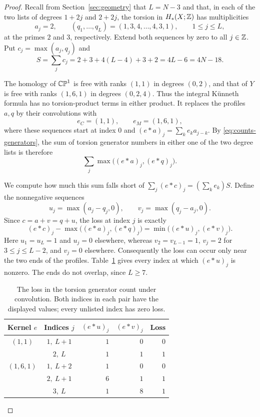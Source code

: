 \begin{proof}
Recall from Section~\ref{sec:geometry} that $L=N-3$ and that, in each of the two lists of degrees
$1+2j$ and $2+2j$, the torsion in $H_*(X;\mathbb Z)$ has multiplicities
\[
 a_j=2,\qquad
 (q_1,\ldots,q_L)=(1,3,4,\ldots,4,3,1),
 \qquad 1\leq j\leq L,
\]
at the primes $2$ and $3$, respectively.  Extend both sequences by
zero to all $j\in\mathbb Z$.  Put $c_j=\max(a_j,q_j)$ and
\begin{equation}\label{eq:counts-S}
 S=\sum_jc_j=2+3+4(L-4)+3+2=4L-6=4N-18.
\end{equation}

The homology of $\mathbb{CP}^1$ is free with ranks $(1,1)$ in degrees
$(0,2)$, and that of $Y$ is free with ranks $(1,6,1)$ in degrees
$(0,2,4)$.  Thus the integral K\"unneth formula has no torsion-product
terms in either product.  It replaces the profiles $a,q$ by their
convolutions with
\[
 e_C=(1,1),\qquad e_M=(1,6,1),
\]
where these sequences start at index $0$ and
$(e*a)_j=\sum_ke_ka_{j-k}$.  By
\eqref{eq:counts-generators}, the sum of torsion generator numbers
in either one of the two degree lists is therefore
\[
 \sum_j\max\bigl((e*a)_j,(e*q)_j\bigr).
\]

We compute how much this sum falls short of
$\sum_j(e*c)_j=(\sum_ke_k)S$.  Define the nonnegative sequences
\[
 u_j=\max(a_j-q_j,0),\qquad
 v_j=\max(q_j-a_j,0).
\]
Since $c=a+v=q+u$, the loss at index $j$ is exactly
\begin{equation}\label{eq:counts-loss}
 (e*c)_j-\max\bigl((e*a)_j,(e*q)_j\bigr)
 =\min\bigl((e*u)_j,(e*v)_j\bigr).
\end{equation}
Here $u_1=u_L=1$ and $u_j=0$ elsewhere, whereas
$v_2=v_{L-1}=1$, $v_j=2$ for $3\leq j\leq L-2$, and $v_j=0$
elsewhere.  Consequently the loss can occur only near the two ends
of the profiles.  Table~\ref{tab:counts-loss} gives every index at
which $(e*u)_j$ is nonzero.  The ends do not overlap, since $L\geq7$.

\begin{table}[htbp]
\centering
\begin{tabular}{@{}ccrrr@{}}
\toprule
Kernel $e$ & Indices $j$ & $(e*u)_j$ & $(e*v)_j$ & Loss \\
\midrule
$(1,1)$ & $1,\ L+1$ & $1$ & $0$ & $0$ \\
         & $2,\ L$   & $1$ & $1$ & $1$ \\
\midrule
$(1,6,1)$ & $1,\ L+2$ & $1$ & $0$ & $0$ \\
           & $2,\ L+1$ & $6$ & $1$ & $1$ \\
           & $3,\ L$   & $1$ & $8$ & $1$ \\
\bottomrule
\end{tabular}
\caption{The loss in the torsion generator count under convolution.
Both indices in each pair have the displayed values; every unlisted
index has zero loss.}
\label{tab:counts-loss}
\end{table}


\end{proof}
